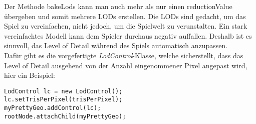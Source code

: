 Der Methode bakeLods kann man auch mehr als nur einen reductionValue übergeben und somit mehrere LODs erstellen. Die LODs sind gedacht, um das Spiel zu vereinfachen, nicht jedoch, um die Spielwelt zu verunstalten. Ein stark vereinfachtes Modell kann dem Spieler durchaus negativ auffallen. Deshalb ist es sinnvoll, das Level of Detail während des Spiels automatisch anzupassen. \\
Dafür gibt es die vorgefertigte \emph{LodControl}-Klasse, welche sicherstellt, dass das Level of Detail ausgehend von der Anzahl eingenommener Pixel angepast wird, hier ein Beispiel:

\begin{lstlisting}
LodControl lc = new LodControl();
lc.setTrisPerPixel(trisPerPixel);
myPrettyGeo.addControl(lc);
rootNode.attachChild(myPrettyGeo);
\end{lstlisting}
\newpage

